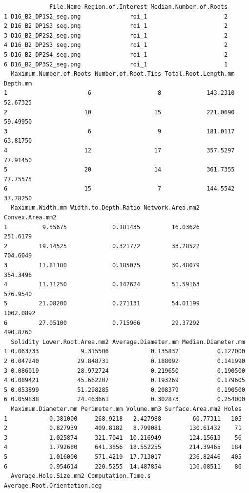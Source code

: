 \documentclass[
  letterpaper,
  DIV=11,
  numbers=noendperiod]{scrartcl}
\begin{document}
\begin{verbatim}
             File.Name Region.of.Interest Median.Number.of.Roots
1 D16_B2_DP1S2_seg.png              roi_1                      2
2 D16_B2_DP1S3_seg.png              roi_1                      2
3 D16_B2_DP2S2_seg.png              roi_1                      2
4 D16_B2_DP2S3_seg.png              roi_1                      2
5 D16_B2_DP2S4_seg.png              roi_1                      2
6 D16_B2_DP3S2_seg.png              roi_1                      1
  Maximum.Number.of.Roots Number.of.Root.Tips Total.Root.Length.mm Depth.mm
1                       6                   8             143.2310 52.67325
2                      10                  15             221.0690 59.49950
3                       6                   9             181.0117 63.81750
4                      12                  17             357.5297 77.91450
5                      20                  14             361.7355 77.75575
6                      15                   7             144.5542 37.78250
  Maximum.Width.mm Width.to.Depth.Ratio Network.Area.mm2 Convex.Area.mm2
1          9.55675             0.181435         16.03626        251.6179
2         19.14525             0.321772         33.28522        704.6049
3         11.81100             0.185075         30.48079        354.3496
4         11.11250             0.142624         51.59163        576.9540
5         21.08200             0.271131         54.01199       1002.0892
6         27.05100             0.715966         29.37292        490.8760
  Solidity Lower.Root.Area.mm2 Average.Diameter.mm Median.Diameter.mm
1 0.063733            9.315506            0.135832           0.127000
2 0.047240           29.848731            0.188092           0.141990
3 0.086019           28.972724            0.219650           0.190500
4 0.089421           45.662207            0.193269           0.179605
5 0.053899           51.298285            0.208379           0.190500
6 0.059838           24.463661            0.302873           0.254000
  Maximum.Diameter.mm Perimeter.mm Volume.mm3 Surface.Area.mm2 Holes
1            0.381000     268.9218   2.427988         60.77311   105
2            0.827939     409.8182   8.799081        130.61432    71
3            1.025874     321.7041  10.216949        124.15613    56
4            1.792680     641.3856  18.552255        214.39465   184
5            1.016000     571.4219  17.713017        236.82446   405
6            0.954614     220.5255  14.487854        136.08511    86
  Average.Hole.Size.mm2 Computation.Time.s Average.Root.Orientation.deg

\end{verbatim}
\end{document}
